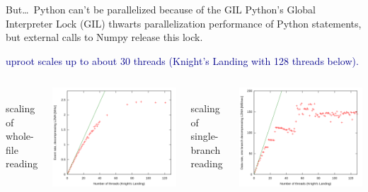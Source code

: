 \documentclass[aspectratio=169]{beamer}
\begin{document}
\begin{frame}{But\ldots\ Python can't be parallelized because of the GIL}
\vspace{0.4 cm}
{\large Python's Global Interpreter Lock (GIL) thwarts parallelization performance of Python statements, but external calls to Numpy release this lock.}

\vspace{0.35 cm}
\textcolor{darkblue}{uproot scales up to about 30 threads (Knight's Landing with 128 threads below).}

\vspace{0.35 cm}
\begin{columns}
\mbox{ } \hfill scaling of whole-file reading \hfill \mbox{ }

\vspace{0.2 cm}
\includegraphics[width=\linewidth]{uproot-scaling.png}

\mbox{ } \hfill scaling of single-branch reading \hfill \mbox{ }

\vspace{0.2 cm}
\includegraphics[width=\linewidth]{uproot-scaling-2.png}

\end{columns}
\end{frame}
\end{document}
